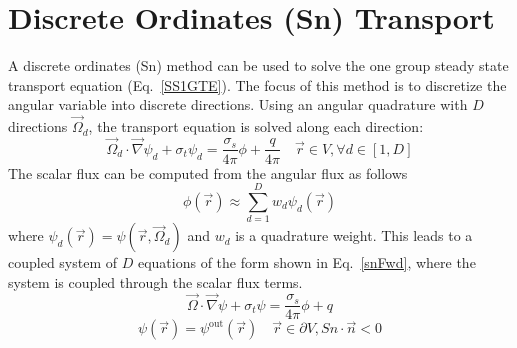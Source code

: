 \documentclass{article}
\newcommand{\vr}{\vec{r}}
\newcommand{\vO}{\vec{\Omega}}
\newcommand{\vgrad}{\vec{\nabla}}
\newcommand{\bound}{\partial V}
\newcommand{\sigt}{\sigma_t}
\newcommand{\sigs}{\sigma_s}
\begin{document}
\section{Discrete Ordinates (Sn) Transport}
A discrete ordinates (Sn) method can be used to solve the one group steady state transport equation (Eq.~\eqref{SS1GTE}). The focus of this method is to discretize the angular variable into discrete directions. Using an angular quadrature with $D$ directions $\vO_d$, the transport equation is solved along each direction:
\begin{equation}
\label{1gTE}
\vO_d \cdot \vgrad \psi_d + \sigt \psi_d = \frac{\sigs}{4 \pi} \phi + \frac{q}{4 \pi} \quad \vr \in V , \forall d\in [1,D]
\end{equation}
%
The scalar flux can be computed from the angular flux as follows
\[
\phi(\vr) \approx \sum_{d=1}^D w_d \psi_d(\vr)
\] 
where $\psi_d(\vr) = \psi(\vr, \vO_d)$ and $w_d$ is a quadrature weight. This leads to a coupled system of $D$ equations of the form shown in Eq.~\eqref{snFwd}, where the system is coupled through the scalar flux terms.
%
\begin{equation}
\label{snFwd}
\vO \cdot \vgrad \psi + \sigt \psi = \frac{\sigs}{4 \pi} \phi + q
\end{equation}
\begin{equation}
\psi(\vr) = \psi^{\text{out}}(\vr) \quad \vr \in \bound , Sn \cdot \vec{n} < 0
\end{equation}

\end{document}
